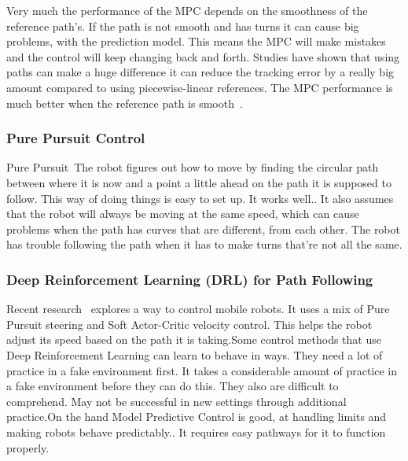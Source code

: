 Very much the performance of the MPC depends on the smoothness of the reference path's. If the path is not smooth and has turns it can cause big problems, with the prediction model. This means the MPC will make mistakes and the control will keep changing back and forth. Studies have shown that using paths can make a huge difference it can reduce the tracking error by a really big amount compared to using piecewise-linear references. The MPC performance is much better when the reference path is smooth~\cite{cao2024pure}.

\subsubsection{Pure Pursuit Control}

Pure Pursuit~\cite{cao2024pure}The robot figures out how to move by finding the circular path between where it is now and a point a little ahead on the path it is supposed to follow. This way of doing things is easy to set up. It works well.. It also assumes that the robot will always be moving at the same speed, which can cause problems when the path has curves that are different, from each other. The robot has trouble following the path when it has to make turns that're not all the same.

\subsubsection{Deep Reinforcement Learning (DRL) for Path Following}

Recent research~\cite{cao2024pure} explores a way to control mobile robots. It uses a mix of Pure Pursuit steering and Soft Actor-Critic velocity control. This helps the robot adjust its speed based on the path it is taking.Some control methods that use Deep Reinforcement Learning can learn to behave in ways. They need a lot of practice in a fake environment first. It takes a considerable amount of practice in a fake environment before they can do this. They also are difficult to comprehend. May not be successful in new settings through additional practice.On the hand Model Predictive Control is good, at handling limits and making robots behave predictably.. It requires easy pathways for it to function properly.

